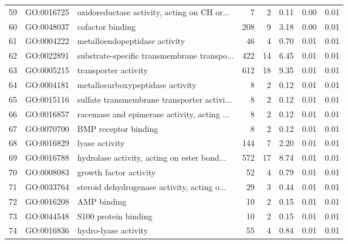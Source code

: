 \begin{table}[ht]
\begin{tabular}{rllrrrrr}
  59 & GO:0016725 & oxidoreductase activity, acting on CH or... &   7 &   2 & 0.11 & 0.00 & 0.01 \\ 
  60 & GO:0048037 & cofactor binding & 208 &   9 & 3.18 & 0.00 & 0.01 \\ 
  61 & GO:0004222 & metalloendopeptidase activity &  46 &   4 & 0.70 & 0.01 & 0.01 \\ 
  62 & GO:0022891 & substrate-specific transmembrane transpo... & 422 &  14 & 6.45 & 0.01 & 0.01 \\ 
  63 & GO:0005215 & transporter activity & 612 &  18 & 9.35 & 0.01 & 0.01 \\ 
  64 & GO:0004181 & metallocarboxypeptidase activity &   8 &   2 & 0.12 & 0.01 & 0.01 \\ 
  65 & GO:0015116 & sulfate transmembrane transporter activi... &   8 &   2 & 0.12 & 0.01 & 0.01 \\ 
  66 & GO:0016857 & racemase and epimerase activity, acting ... &   8 &   2 & 0.12 & 0.01 & 0.01 \\ 
  67 & GO:0070700 & BMP receptor binding &   8 &   2 & 0.12 & 0.01 & 0.01 \\ 
  68 & GO:0016829 & lyase activity & 144 &   7 & 2.20 & 0.01 & 0.01 \\ 
  69 & GO:0016788 & hydrolase activity, acting on ester bond... & 572 &  17 & 8.74 & 0.01 & 0.01 \\ 
  70 & GO:0008083 & growth factor activity &  52 &   4 & 0.79 & 0.01 & 0.01 \\ 
  71 & GO:0033764 & steroid dehydrogenase activity, acting o... &  29 &   3 & 0.44 & 0.01 & 0.01 \\ 
  72 & GO:0016208 & AMP binding &  10 &   2 & 0.15 & 0.01 & 0.01 \\ 
  73 & GO:0044548 & S100 protein binding &  10 &   2 & 0.15 & 0.01 & 0.01 \\ 
  74 & GO:0016836 & hydro-lyase activity &  55 &   4 & 0.84 & 0.01 & 0.01 \\ 
   \hline
\end{tabular}
\end{table}
